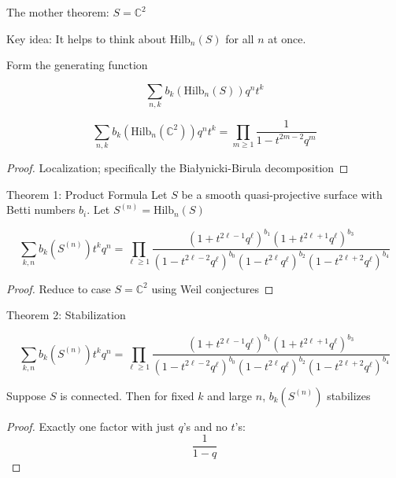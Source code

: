 \documentclass{beamer}
\newcommand{\Hilb}{\textrm{Hilb}}
\newcommand{\C}{\mathbb{C}}
\begin{document}
\begin{frame}{The mother theorem: $S=\C^2$}


\begin{block}{Key idea:}
It helps to think about $\Hilb_n(S)$ for all $n$ at once.  
\end{block}

Form the generating function

$$\sum_{n,k} b_k(\Hilb_n(S)) q^n t^k$$

\begin{theorem}

$$\sum_{n,k} b_k(\Hilb_n(\C^2)) q^n t^k=\prod_{m\geq 1} \frac{1}{1-t^{2m-2}q^m}$$


\end{theorem}


\begin{proof} Localization; specifically the Bia\l ynicki-Birula decomposition

\end{proof}

\end{frame}



\begin{frame}{Theorem 1: Product Formula}
Let $S$ be a smooth quasi-projective surface with Betti numbers $b_i$.  Let $S^{(n)}=\Hilb_n(S)$

\begin{Theorem}[G\"ottsche, 1990]
$$\sum_{k,n} b_k(S^{(n)})t^k q^n=\prod_{\ell\geq 1} \frac{(1+t^{2\ell-1}q^\ell)^{b_1}(1+t^{2\ell+1}q^\ell)^{b_3}}{(1-t^{2\ell-2}q^\ell)^{b_0}(1-t^{2\ell}q^\ell)^{b_2}(1-t^{2\ell+2}q^\ell)^{b_4}}$$
\end{Theorem}

\begin{proof} 
 Reduce to case $S=\C^2$ using Weil conjectures
\end{proof}

\end{frame}

\begin{frame}{Theorem 2: Stabilization}
  \begin{Theorem}[G\"ottsche, 1990]
$$\sum_{k,n} b_k(S^{(n)})t^k q^n=\prod_{\ell\geq 1} \frac{(1+t^{2\ell-1}q^\ell)^{b_1}(1+t^{2\ell+1}q^\ell)^{b_3}}{(1-t^{2\ell-2}q^\ell)^{b_0}(1-t^{2\ell}q^\ell)^{b_2}(1-t^{2\ell+2}q^\ell)^{b_4}}$$
\end{Theorem}
\begin{corollary}  Suppose $S$ is connected.
Then for fixed $k$ and large $n$, $b_{k}(S^{(n)})$ stabilizes
\end{corollary}

\begin{proof}
Exactly one factor with just $q$'s and no $t$'s:
$$\frac{1}{1-q}$$ 

\end{proof}


\end{frame}
\end{document}

